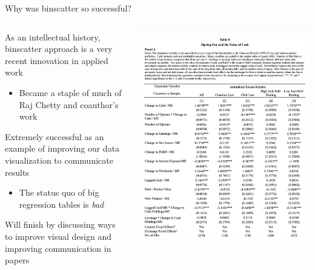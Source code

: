 \documentclass[notes,11pt, aspectratio=169]{beamer}
\newenvironment{wideitemize}{\itemize\addtolength{\itemsep}{10pt}}{\enditemize}
\begin{document}
\begin{frame}{Why was binscatter so successful?}
  \begin{columns}[T] %
    \begin{column}{.7\textwidth}
      \begin{wideitemize}
      \item As an intellectual history, binscatter approach is a very
        recent innovation in applied work
        \begin{itemize}
        \item Became a staple of much of Raj Chetty and coauthor's work
        \end{itemize}
      \item Extremely successful as an example of improving our data
        visualization to communicate results
        \begin{itemize}
        \item The status quo of big regression tables is \emph{bad}
        \end{itemize}
      \item Will finish by discussing ways to improve visual design
        and improving communication in papers
  \end{wideitemize}
  \end{column}%
  \hfill%
  \begin{column}{.3\textwidth}
          \includegraphics[width=\linewidth]{bad_table.png}
  \end{column}
\end{columns}
\end{frame}
\end{document}
